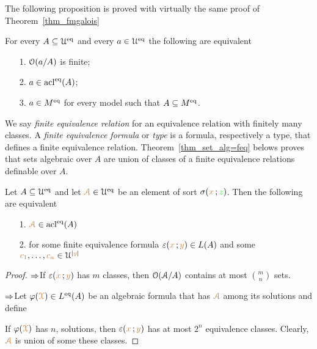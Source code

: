 \documentclass[creche.tex]{subfiles}
\begin{document}
The following proposition is proved with virtually the same proof of Theorem~\ref{thm_fmgalois}

\begin{theorem}\label{thm_Galois_alg=alg}
For every $A\subseteq\EuScript U^{{\rm eq}}$ and every $a\in\EuScript U^{{\rm eq}}$ the following are equivalent
\begin{itemize}
\item[1.] $\EuScript O(a/A)$ is finite;
\item[2.] $a\in\mathop{\rm acl}^{{\rm eq}}(A)$;
\item[3.] $a\in M^{{\rm eq}}$ for every model such that $A\subseteq M^{{\rm eq}}$.\QED
\end{itemize}
\end{theorem}





We say \emph{finite equivalence relation\/} for an equivalence relation with finitely many classes. A \emph{finite equivalence formula\/} or \emph{type\/} is a formula, respectively a type, that defines a finite equivalence relation. Theorem~\ref{thm_set_alg=feq} belows proves that sets algebraic over $A$ are union of classes of a finite equivalence relations definable over $A$.


\begin{theorem}\label{thm_set_alg=feq}
Let $A\subseteq\EuScript U^{{\rm eq}}$ and let ${\color{brown}\EuScript A}\in\EuScript U^{{\rm eq}}$ be an element of sort $\sigma({\color{brown} x}\,;{\color{green} z})$.  Then the following are equivalent
\begin{itemize}
\item[1.] ${\color{brown}\EuScript A}\in\mathop{\rm acl}^{{\rm eq}}(A)$
\item[2.] for some finite equivalence formula $\varepsilon({\color{brown} x}\,;{\color{brown} y})\in L(A)$ and some ${\color{brown} c_1},\dots,{\color{brown} c_n}\in\EuScript U^{|{\color{brown} y}|}$
\end{itemize}


\end{theorem}
\begin{proof} $\Rightarrow$\quad If  $\varepsilon({\color{brown} x}\,;{\color{brown} y})$ has $m$ classes, then $\EuScript O(\EuScript A/A)$ contains at most $\displaystyle{m\choose n}$ sets.

$\Rightarrow$\quad Let $\varphi({\color{brown}\EuScript X})\in L^{{\rm eq}}(A)$ be an algebraic formula that has ${\color{brown}\EuScript A}$ among its solutions and define


If $\varphi({\color{brown}\EuScript X})$ has $n$, solutions, then $\varepsilon({\color{brown} x}\,;{\color{brown} y})$ has at most $2^n$ equivalence classes. Clearly, ${\color{brown}\EuScript A}$ is union of some these classes.
\end{proof}
\end{document}
